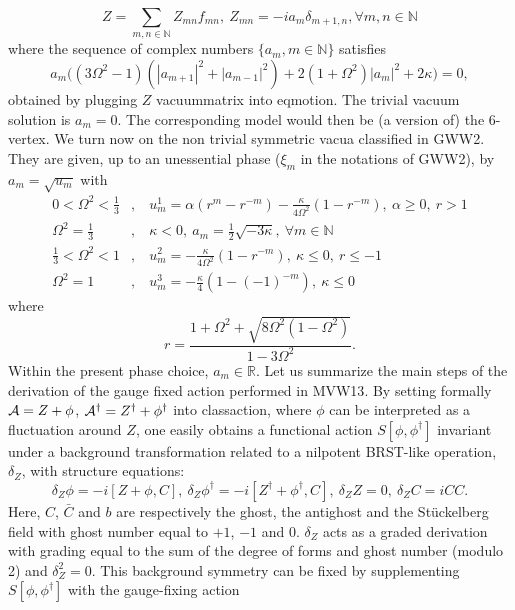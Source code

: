 \documentclass[10pt]{book}
\theoremstyle{break}
\begin{document}
\begin{equation*}
Z=\sum_{m,n\in\mathbb{N}}Z_{mn}f_{mn},\ Z_{mn}=-ia_{m}\delta_{m+1,n}, \forall m,n\in\mathbb{N}
\end{equation*}
where  the sequence of complex numbers $\{a_m, m\in\mathbb{N}\}$ satisfies
\begin{equation*}
a_m\bigg((3\Omega^2-1)(|a_{m+1}|^2+|a_{m-1}|^2)+2(1+\Omega^2)|a_m|^2+2\kappa  \bigg)=0,
\end{equation*}
obtained by plugging $Z$ {vacuummatrix} into {eqmotion}. The trivial vacuum solution is $a_m=0$. The corresponding model would then be (a version of) the 6-vertex. We turn now on the non trivial symmetric vacua classified in {GWW2}. They are given, up to an unessential phase ($\xi_m$ in the notations of {GWW2}), by $a_m=\sqrt{u_m}$ with
\begin{eqnarray*}
0<\Omega^2<\frac{1}{3}&,&\ u^1_m=\alpha(r^m-r^{-m})-\frac{\kappa}{4\Omega^2}(1-r^{-m}),\ \alpha\ge0,\ r>1\\
\Omega^2={\frac{1}{3}}&,&\ \kappa<0,\ a_m={\frac12}{\sqrt{ -3\kappa}},\ \forall m\in\mathbb{N}\\
\frac{1}{3}<\Omega^2<1&,&\ u^2_m=-\frac{\kappa}{4\Omega^2}(1-r^{-m}),\ \kappa\le0,\ r\le-1\\
\Omega^2=1&,&\ u^3_m=-\frac{\kappa}{4}(1-(-1)^{-m}),\ \kappa\le0
\end{eqnarray*}
where
\begin{equation*}
r=\frac{1+\Omega^2+\sqrt{8\Omega^2(1-\Omega^2)}}{1-3\Omega^2}.
\end{equation*}
Within the present phase choice, $a_m\in\mathbb{R}$. Let us summarize the main steps of the derivation of the gauge fixed action performed in {MVW13}. By setting formally ${\cal{A}}=Z+\phi$, ${\cal{A}}^\dag=Z^\dag+\phi^\dag$ into {classaction}, where $\phi$ can be interpreted as a fluctuation around $Z$, one easily obtains a functional action $S[\phi,\phi^\dag]$ invariant under a background transformation related to a nilpotent BRST-like operation, $\delta_Z$, with structure equations:
\begin{equation*}
\delta_Z\phi=-i[Z+\phi,C],\ \delta_Z\phi^\dag=-i[Z^\dag+\phi^\dag,C],\ \delta_ZZ=0,\ \delta_ZC=iCC.
\end{equation*}
Here, $C$, ${\bar{C}}$ and $b$ are respectively the ghost, the antighost and the St\"uckelberg field with ghost number equal to $+1$, $-1$ and $0$. $\delta_Z$ acts as a graded derivation with grading equal to the sum of the degree of forms and ghost number (modulo 2) and $\delta_Z^2=0$. This background symmetry can be fixed by supplementing $S[\phi,\phi^\dag]$ with the gauge-fixing action
\end{document}
